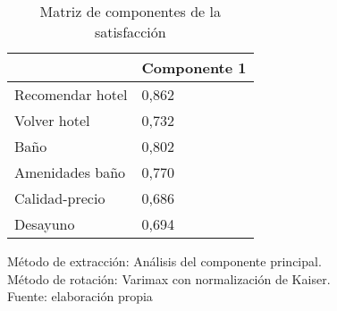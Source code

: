 \begin{table}[h]
    \caption {Matriz de componentes de la satisfacción}
	\label{tab:componentesS}
	\setlength\extrarowheight{5pt}
	
	\begin{tabular}{p{8.0cm} p{4.3cm}}
	\toprule
		& Componente 1 \\
	\midrule
	Recomendar hotel & 0,862 \\
	Volver hotel & 0,732 \\
	Baño & 0,802 \\
	Amenidades baño & 0,770 \\
	Calidad-precio & 0,686 \\
	Desayuno & 0,694 \\
	
	\bottomrule
	\end{tabular}
	
	\center
	\footnotesize
	Método de extracción: Análisis del componente principal.\\
	Método de rotación: Varimax con normalización de Kaiser.\\
	Fuente: elaboración propia
\end{table}
